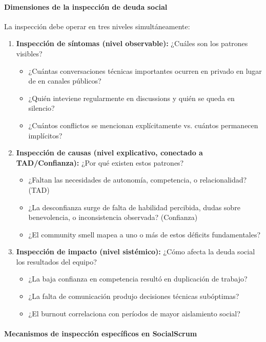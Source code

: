 \paragraph{Dimensiones de la inspección de deuda social}

La inspección debe operar en tres niveles simultáneamente:

\begin{enumerate}

\item \textbf{Inspección de síntomas (nivel observable):} ¿Cuáles son los patrones visibles?
\begin{itemize}
\item ¿Cuántas conversaciones técnicas importantes ocurren en privado en lugar de en canales públicos?
\item ¿Quién inteviene regularmente en discussions y quién se queda en silencio?
\item ¿Cuántos conflictos se mencionan explícitamente vs. cuántos permanecen implícitos?
\end{itemize}

\item \textbf{Inspección de causas (nivel explicativo, conectado a TAD/Confianza):} ¿Por qué existen estos patrones?
\begin{itemize}
\item ¿Faltan las necesidades de autonomía, competencia, o relacionalidad? (TAD)
\item ¿La desconfianza surge de falta de habilidad percibida, dudas sobre benevolencia, o inconsistencia observada? (Confianza)
\item ¿El community smell mapea a uno o más de estos déficits fundamentales?
\end{itemize}

\item \textbf{Inspección de impacto (nivel sistémico):} ¿Cómo afecta la deuda social los resultados del equipo?
\begin{itemize}
\item ¿La baja confianza en competencia resultó en duplicación de trabajo?
\item ¿La falta de comunicación produjo decisiones técnicas subóptimas?
\item ¿El burnout correlaciona con períodos de mayor aislamiento social?
\end{itemize}

\end{enumerate}

\paragraph{Mecanismos de inspección específicos en SocialScrum}

